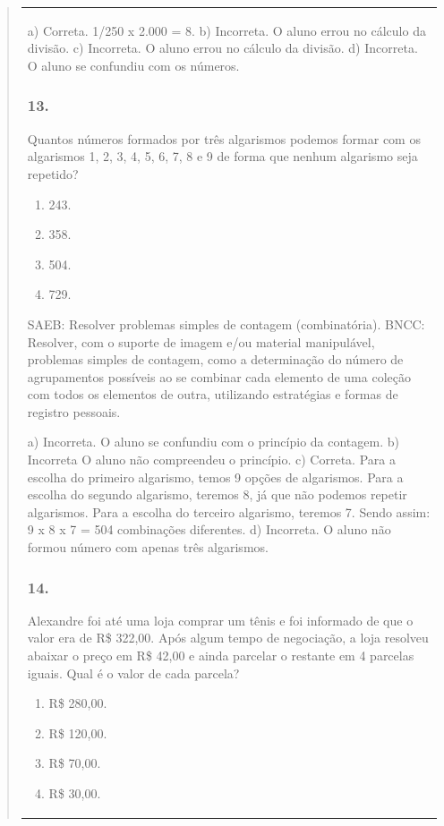 \begin{mdframed}[linewidth=2pt,linecolor=salmao,roundcorner=2pt]
\begin{itemize}
{\begin{itemize}
\begin{escolha}
{\begin{quote}
{\begin{escolha}
{{{{{\begin{longtable}[]{@{}l@{}}
\begin{itemize}
{\begin{escolha}
a) Correta. 1/250 x 2.000 = 8.
b) Incorreta. O aluno errou no cálculo da divisão.
c) Incorreta. O aluno errou no cálculo da divisão.
d) Incorreta. O aluno se confundiu com os números.

\subsubsection{13.}

Quantos números formados por três algarismos podemos formar com os
algarismos 1, 2, 3, 4, 5, 6, 7, 8 e 9 de forma que nenhum algarismo seja
repetido?

\begin{enumerate}
\item
  243.
\item
  358.
\item
  504.
\item
  729.
\end{enumerate}

SAEB: Resolver problemas simples de contagem (combinatória).
BNCC: Resolver, com o suporte de imagem e/ou material manipulável, problemas simples
de contagem, como a determinação do número de agrupamentos possíveis ao se combinar cada
elemento de uma coleção com todos os elementos de outra, utilizando estratégias e formas de
registro pessoais.

a) Incorreta. O aluno se confundiu com o princípio da contagem.
b) Incorreta O aluno não compreendeu o princípio.
c) Correta. Para a escolha do primeiro algarismo, temos 9 opções de algarismos. Para
a escolha do segundo algarismo, teremos 8, já que não podemos repetir
algarismos. Para a escolha do terceiro algarismo, teremos 7. Sendo assim: 9 x 8 x 7 = 504 combinações diferentes.
d) Incorreta. O aluno não formou número com apenas três algarismos.

\subsubsection{14.}

Alexandre foi até uma loja comprar um tênis e foi informado de que o valor
era de R\$ 322,00. Após algum tempo de negociação, a loja resolveu
abaixar o preço em R\$ 42,00 e ainda parcelar o restante em 4 parcelas iguais.
Qual é o valor de cada parcela?

\begin{enumerate}
\item
  R\$ 280,00.
\item
  R\$ 120,00.
\item
  R\$ 70,00.
\item
  R\$ 30,00.
\end{enumerate}


\end{escolha}}
\end{itemize}
\end{longtable}}}}}}
\end{escolha}}
\end{quote}}
\end{escolha}
\end{itemize}}
\end{itemize}
\end{mdframed}
